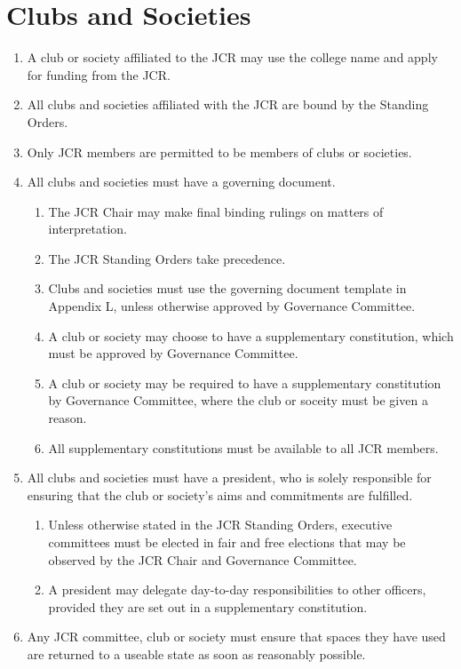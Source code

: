 \documentclass[12pt]{article}
\begin{document}
\section{Clubs and Societies}
\begin{enumerate}
    \item A club or society affiliated to the JCR may use the college name and apply for funding from the JCR.
    \item All clubs and societies affiliated with the JCR are bound by the Standing Orders.
    \item Only JCR members are permitted to be members of clubs or societies.
    \item All clubs and societies must have a governing document.
    \begin{enumerate}
        \item The JCR Chair may make final binding rulings on matters of interpretation.
        \item The JCR Standing Orders take precedence.
        \item Clubs and societies must use the governing document template in Appendix L, unless otherwise approved by Governance Committee.
        \item A club or society may choose to have a supplementary constitution, which must be approved by Governance Committee.
        \item A club or society may be required to have a supplementary constitution by Governance Committee, where the club or soceity must be given a reason.
        \item All supplementary constitutions must be available to all JCR members.
    \end{enumerate}
    \item All clubs and societies must have a president, who is solely responsible for ensuring that the club or society's aims and commitments are fulfilled.
    \begin{enumerate}
        \item Unless otherwise stated in the JCR Standing Orders, executive committees must be elected in fair and free elections that may be observed by the JCR Chair and Governance Committee.
        \item A president may delegate day-to-day responsibilities to other officers, provided they are set out in a supplementary constitution.
    \end{enumerate}
    \item Any JCR committee, club or society must ensure that spaces they have used are returned to a useable state as soon as reasonably possible.

\end{enumerate}
\end{document}
